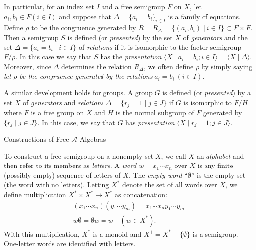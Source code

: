 \documentclass{surv-l}
\numberwithin{equation}{section}
\numberwithin{table}{section}
\numberwithin{figure}{section}
\theoremstyle{definition}
\begin{document}
In particular, for an index set $I$ and a free semigroup $F$ on
$X$, let $a_{i}, b_{i}\in F (i\in I)$ and suppose that
$\Delta=\{a_{i}=b_{i}\}_{i\in I}$ is a family of equations.
Define $\rho$ to be the congruence generated by
$R=R_{\Delta}=\{(a_{i}, b_{i})\mid i\in I\} \subset F\times
F$. Then a semigroup $S$ is defined (or
\emph{presented}) by the set $X$ of
\emph{generators} and the set $\Delta=\{a_{i}=b_{i}\mid i\in I\}$
of \emph{relations} if it is isomorphic to the
factor semigroup $F/\rho$. In this case we say that $S$ has the
\emph{presentation} $\langle X \mid a_{i}=
b_{i};i\in I \rangle=\langle X\mid \Delta\rangle$.
Moreover, since $\Delta$ determines the relation
$R_{\Delta}$, we often define $\rho$ by simply saying
\emph{let} $\rho$ \emph{be the congruence generated by the
relations} $a_{i}=b_{i}\ (i\in I)$.

A similar development holds for groups. A group $G$ is defined (or
\emph{presented}) by
a set $X$ of \emph{generators} and \emph{relations}
$\Delta=\{r_{j}=1\mid j\in J\}$ if $G$ is isomorphic to
$F/H$ where $F$ is a free group on $X$ and $H$ is the normal
subgroup of $F$ generated by $\{r_{j}\mid j\in J\}$. In this
case, we say that $G$ has \emph{presentation} $\langle X\mid
r_{j}=1;j\in J\rangle$.

\begin{center}
Constructions of Free $\mathcal{A}$-Algebras
\end{center}

To construct a free semigroup on a nonempty set $X$, we call $X$
an \emph{alphabet} and then refer to
its members as \emph{letters}. A \emph{word} $w=x_{1}\cdots x_{n}$
over $X$ is any finite (possibly empty) sequence of letters of
$X$. The \emph{empty word} ``$\emptyset$'' is
the empty set (the word with no letters). Letting $X^{\ast}$
denote the set of all words over $X$, we define multiplication
$X^{\ast}\times X^{\ast}\rightarrow X^{\ast}$ as concatenation:
\begin{gather*}
(x_{1}\cdots x_{n})(y_{1}\cdots y_{m})=x_{1}\cdots x_{n}y_{1}\cdots y_{m} \\
w\emptyset=\emptyset w=w\quad (w\in X^{\ast}).
\end{gather*}
With this multiplication, $X^{\ast}$ is a monoid and
$X^{+}=X^{\ast}-\{\emptyset\}$ is a semigroup. One-letter words
are identified with letters.
\end{document}
